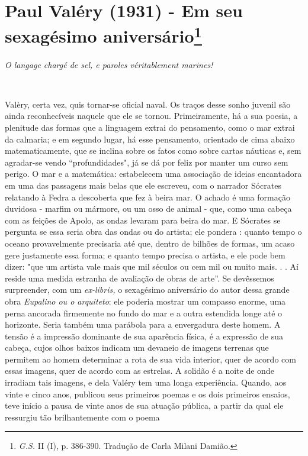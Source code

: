 \chapter{Paul Valéry (1931) - Em seu sexagésimo aniversário\footnote[*]{\emph{G.S.} II (I), p. 386-390. Tradução de Carla Milani Damião.}}

\emph{O langage chargé de sel, e paroles véritablement marines!}

~

Valèry, certa vez, quis tornar-se oficial naval. Os traços desse sonho
juvenil são ainda reconhecíveis naquele que ele se tornou.
Primeiramente, há a sua poesia, a plenitude das formas que a linguagem
extrai do pensamento, como o mar extrai da calmaria; e em segundo lugar,
há esse pensamento, orientado de cima abaixo matematicamente, que se
inclina sobre os fatos como sobre cartas náuticas e, sem agradar-se
vendo ``profundidades", já se dá por feliz por manter um curso sem
perigo. O mar e a matemática: estabelecem uma associação de ideias
encantadora em uma das passagens mais belas que ele escreveu, com o
narrador Sócrates relatando à Fedra a descoberta que fez à beira mar. O
achado é uma formação duvidosa - marfim ou mármore, ou um osso de animal
- que, como uma cabeça com as feições de Apolo, as ondas levaram para
beira do mar. E Sócrates se pergunta se essa seria obra das ondas ou do
artista; ele pondera : quanto tempo o oceano provavelmente precisaria
até que, dentro de bilhões de formas, um acaso gere justamente essa
forma; e quanto tempo precisa o artista, e ele pode bem dizer: "que um
artista vale mais que mil séculos ou cem mil ou muito mais. . . Aí
reside uma medida estranha de avaliação de obras de arte''. Se
devêssemos surpreender, com um \emph{ex-libris,} o sexagésimo
aniversário do autor dessa grande obra \emph{Eupalino ou o arquiteto}:
ele poderia mostrar um compasso enorme, uma perna ancorada firmemente no
fundo do mar e a outra estendida longe até o horizonte. Seria também uma
parábola para a envergadura deste homem. A tensão é a impressão
dominante de sua aparência física, é a expressão de sua cabeça, cujos
olhos baixos indicam um devaneio de imagens terrenas que permitem ao
homem determinar a rota de sua vida interior, quer de acordo com essas
imagens, quer de acordo com as estrelas. A solidão é a noite de onde
irradiam tais imagens, e dela Valéry tem uma longa experiência. Quando,
aos vinte e cinco anos, publicou seus primeiros poemas e os dois
primeiros ensaios, teve início a pausa de vinte anos de sua atuação
pública, a partir da qual ele ressurgiu tão brilhantemente com o poema
